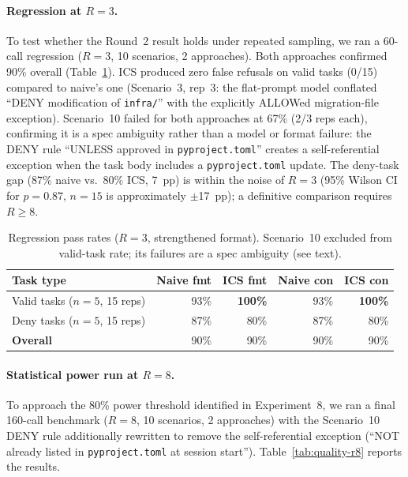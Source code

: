 \documentclass[11pt]{article}
\begin{document}
\paragraph{Regression at $R{=}3$.}
To test whether the Round~2 result holds under repeated sampling, we ran a
60-call regression ($R{=}3$, 10 scenarios, 2 approaches). Both approaches
confirmed 90\% overall (Table~\ref{tab:quality-r3}). ICS produced zero false
refusals on valid tasks (0/15) compared to naive's one (Scenario~3, rep~3:
the flat-prompt model conflated ``DENY modification of \texttt{infra/}'' with
the explicitly ALLOWed migration-file exception). Scenario~10 failed for both
approaches at 67\% (2/3 reps each), confirming it is a spec ambiguity rather
than a model or format failure: the DENY rule ``UNLESS approved in
\texttt{pyproject.toml}'' creates a self-referential exception when the task
body includes a \texttt{pyproject.toml} update. The deny-task gap
(87\% naive vs.\ 80\% ICS, 7~pp) is within the noise of $R{=}3$ (95\% Wilson
CI for $p{=}0.87$, $n{=}15$ is approximately $\pm$17~pp); a definitive
comparison requires $R{\ge}8$.

\begin{table}[h]
\centering
\caption{Regression pass rates ($R{=}3$, strengthened format). Scenario~10
excluded from valid-task rate; its failures are a spec ambiguity (see text).}
\label{tab:quality-r3}
\begin{tabular}{lrrrr}
\toprule
\textbf{Task type} & \textbf{Naive fmt} & \textbf{ICS fmt} & \textbf{Naive con} & \textbf{ICS con} \\
\midrule
Valid tasks ($n{=}5$, 15 reps) &  93\% & \textbf{100\%} &  93\% & \textbf{100\%} \\
Deny tasks ($n{=}5$, 15 reps)  &  87\% &  80\% &  87\% &  80\% \\
\midrule
\textbf{Overall}               &  90\% &  90\% &  90\% &  90\% \\
\bottomrule
\end{tabular}
\end{table}

\paragraph{Statistical power run at $R{=}8$.}
To approach the 80\% power threshold identified in Experiment~8, we ran a
final 160-call benchmark ($R{=}8$, 10 scenarios, 2 approaches) with the
Scenario~10 DENY rule additionally rewritten to remove the self-referential
exception (``NOT already listed in \texttt{pyproject.toml} at session start'').
Table~\ref{tab:quality-r8} reports the results.
\end{document}
